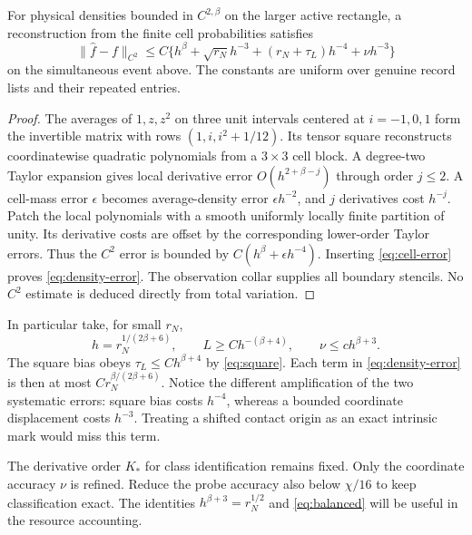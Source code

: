\begin{lemma}
\label{lem:histogram}
For physical densities bounded in $C^{2,\beta}$ on the larger active
rectangle, a reconstruction from the finite cell probabilities satisfies
\begin{equation}\label{eq:density-error}
 \|\widehat f-f\|_{C^2}\le
 C\{h^\beta+\sqrt{r_N}h^{-3}+(r_N+\tau_L)h^{-4}
                                      +\nu h^{-3}\}
\end{equation}
on the simultaneous event above. The constants are uniform over genuine
record lists and their repeated entries.
\end{lemma}
\begin{proof}
The averages of $1,z,z^2$ on three unit intervals centered at
$i=-1,0,1$ form the invertible matrix with rows $(1,i,i^2+1/12)$.
Its tensor square reconstructs coordinatewise quadratic polynomials
from a $3\times3$ cell block. A degree-two Taylor expansion gives
local derivative error $O(h^{2+\beta-j})$ through order $j\le2$.
A cell-mass error $\epsilon$ becomes average-density error
$\epsilon h^{-2}$, and $j$ derivatives cost $h^{-j}$.
Patch the local polynomials with a smooth uniformly locally finite
partition of unity. Its derivative costs are offset by the corresponding
lower-order Taylor errors. Thus the $C^2$ error is bounded by
$C(h^\beta+\epsilon h^{-4})$. Inserting \eqref{eq:cell-error} proves
\eqref{eq:density-error}. The observation collar supplies all boundary
stencils. No $C^2$ estimate is deduced directly from total variation.
\end{proof}

In particular take, for small $r_N$,
\begin{equation}\label{eq:balanced}
 h=r_N^{1/(2\beta+6)},\qquad
 L\ge C h^{-(\beta+4)},\qquad
 \nu\le c h^{\beta+3}.
\end{equation}
The square bias obeys $\tau_L\le Ch^{\beta+4}$ by \eqref{eq:square}.
Each term in \eqref{eq:density-error} is then at most
$C r_N^{\beta/(2\beta+6)}$. Notice the different amplification of the
two systematic errors: square bias costs $h^{-4}$, whereas a bounded
coordinate displacement costs $h^{-3}$. Treating a shifted contact origin
as an exact intrinsic mark would miss this term.

The derivative order $K_*$ for class identification remains fixed.
Only the coordinate accuracy $\nu$ is refined. Reduce the probe accuracy
also below $\chi/16$ to keep classification exact. The identities
$h^{\beta+3}=r_N^{1/2}$ and \eqref{eq:balanced} will be useful in the
resource accounting.

